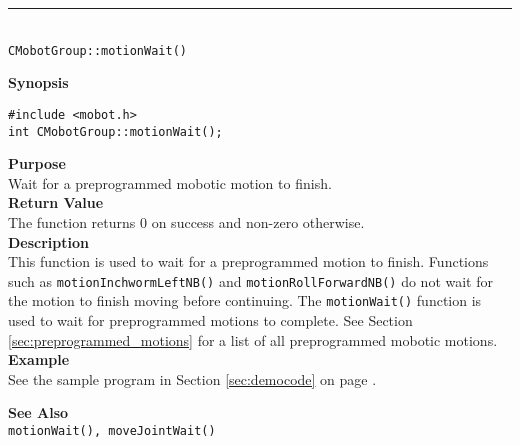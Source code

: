 \noindent
\vspace{5pt}
\rule{4.5in}{0.015in}\\
\noindent
{\LARGE \texttt{CMobotGroup::motionWait()}}\\
{}

\noindent
{\bf Synopsis}
\vspace{-8pt}
\begin{verbatim}
#include <mobot.h>
int CMobotGroup::motionWait();
\end{verbatim}

\noindent
{\bf Purpose}\\
Wait for a preprogrammed mobotic motion to finish.\\

\noindent
{\bf Return Value}\\
The function returns 0 on success and non-zero otherwise.\\

\noindent
{\bf Description}\\
This function is used to wait for a preprogrammed motion to finish. Functions such as
\texttt{motionInchwormLeftNB()} and \texttt{motionRollForwardNB()} do not wait for the motion to finish
moving before continuing. The
\texttt{motionWait()} function is used to wait for
preprogrammed motions to complete. See Section \ref{sec:preprogrammed_motions} for 
a list of all preprogrammed mobotic motions.\\

\noindent
{\bf Example}\\
See the sample program in Section \ref{sec:democode} on page \pageref{sec:democode}.
\noindent

\noindent
{\bf See Also}\\
\texttt{motionWait(), moveJointWait()}

